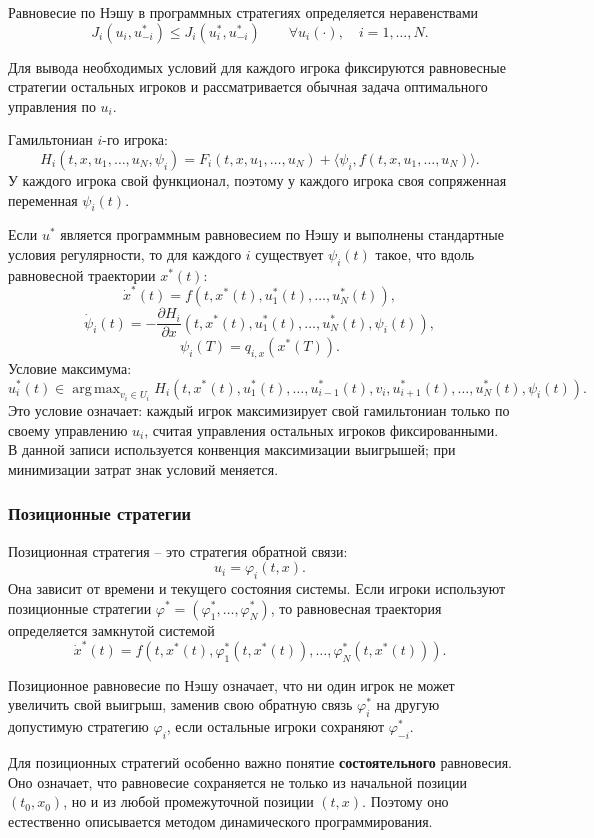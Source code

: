 \documentclass[12pt,a4paper]{article}
\DeclareMathOperator*{\argmax}{arg\,max}
\begin{document}
Равновесие по Нэшу в программных стратегиях определяется неравенствами
\[
 J_i(u_i,u_{-i}^*)\le J_i(u_i^*,u_{-i}^*)
 \qquad \forall u_i(\cdot),\quad i=1,\ldots,N.
\]

Для вывода необходимых условий для каждого игрока фиксируются равновесные стратегии остальных игроков и рассматривается обычная задача оптимального управления по $u_i$.

Гамильтониан $i$-го игрока:
\[
 H_i(t,x,u_1,\ldots,u_N,\psi_i)=F_i(t,x,u_1,\ldots,u_N)+\langle\psi_i,f(t,x,u_1,\ldots,u_N)\rangle.
\]
У каждого игрока свой функционал, поэтому у каждого игрока своя сопряженная переменная $\psi_i(t)$.

Если $u^*$ является программным равновесием по Нэшу и выполнены стандартные условия регулярности, то для каждого $i$ существует $\psi_i(t)$ такое, что вдоль равновесной траектории $x^*(t)$:
\[
 \dot x^*(t)=f(t,x^*(t),u_1^*(t),\ldots,u_N^*(t)),
\]
\[
 \dot\psi_i(t)=-\frac{\partial H_i}{\partial x}(t,x^*(t),u_1^*(t),\ldots,u_N^*(t),\psi_i(t)),
\]
\[
 \psi_i(T)=q_{i,x}(x^*(T)).
\]
Условие максимума:
\[
 u_i^*(t)\in\argmax_{v_i\in U_i}H_i(t,x^*(t),u_1^*(t),\ldots,u_{i-1}^*(t),v_i,u_{i+1}^*(t),\ldots,u_N^*(t),\psi_i(t)).
\]
Это условие означает: каждый игрок максимизирует свой гамильтониан только по своему управлению $u_i$, считая управления остальных игроков фиксированными. В данной записи используется конвенция максимизации выигрышей; при минимизации затрат знак условий меняется.

\subsubsection{Позиционные стратегии}

Позиционная стратегия -- это стратегия обратной связи:
\[
 u_i=\varphi_i(t,x).
\]
Она зависит от времени и текущего состояния системы. Если игроки используют позиционные стратегии $\varphi^*=(\varphi_1^*,\ldots,\varphi_N^*)$, то равновесная траектория определяется замкнутой системой
\[
 \dot x^*(t)=f(t,x^*(t),\varphi_1^*(t,x^*(t)),\ldots,\varphi_N^*(t,x^*(t))).
\]

Позиционное равновесие по Нэшу означает, что ни один игрок не может увеличить свой выигрыш, заменив свою обратную связь $\varphi_i^*$ на другую допустимую стратегию $\varphi_i$, если остальные игроки сохраняют $\varphi_{-i}^*$.

Для позиционных стратегий особенно важно понятие \textbf{состоятельного} равновесия. Оно означает, что равновесие сохраняется не только из начальной позиции $(t_0,x_0)$, но и из любой промежуточной позиции $(t,x)$. Поэтому оно естественно описывается методом динамического программирования.
\end{document}
